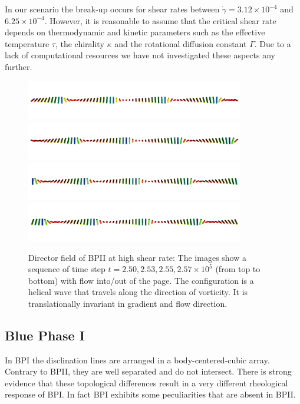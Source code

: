 \documentclass[aps,pre,reprint,superscriptaddress, twocolumn]{revtex4}
\newcommand{\e}[1]{\times10^{#1}}
\newcommand{\gd}{\dot{\gamma}}
\begin{document}
In our scenario the break-up occurs for shear rates between $\gd=3.12\e{-4}$ and $6.25\e{-4}$.
However, it is reasonable to assume that the critical shear rate depends on thermodynamic and kinetic parameters
such as the effective temperature $\tau$, the chirality $\kappa$ and the rotational diffusion constant $\Gamma$.
Due to a lack of computational resources we have not investigated these aspects any further.

\begin{figure}[h]
\includegraphics[width=0.85\textwidth]{dir+y-250k_run949.png}
\includegraphics[width=0.85\textwidth]{dir+y-253k_run949.png}
\includegraphics[width=0.85\textwidth]{dir+y-255k_run949.png}
\includegraphics[width=0.85\textwidth]{dir+y-257k_run949.png}
\caption{Director field of BPII at high shear rate: The images show a sequence of time step $t=2.50, 2.53,2.55, 2.57\e{5}$ (from top to bottom) with flow into/out of the page. The configuration is a helical wave that travels along the direction of vorticity. It is translationally invariant in gradient and flow direction.}
\label{bp2-high}
\end{figure}

\clearpage

\subsection{Blue Phase I}

In BPI the disclination lines are arranged in a body-centered-cubic array.
Contrary to BPII, they are well separated and do not intersect. 
There is strong evidence that these topological differences result in 
a very different rheological response of BPI. In fact BPI exhibits some 
peculiarities that are absent in BPII.
\end{document}
